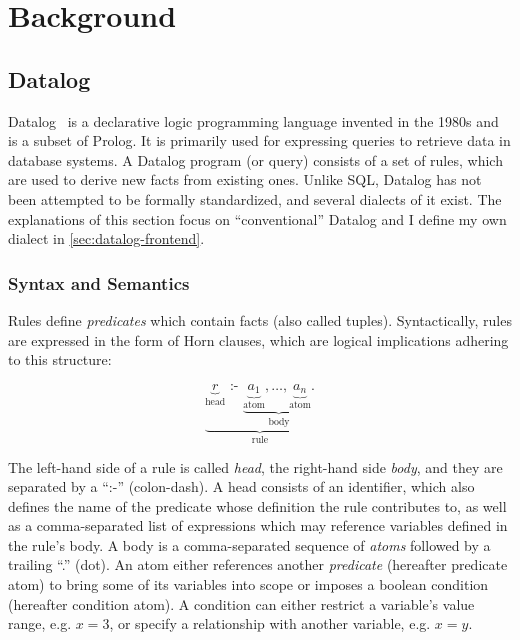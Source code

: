 
\chapter{Background}\label{ch:background}

\section{Datalog}\label{sec:datalog}

Datalog~\cite{green2013datalog} is a declarative logic programming language
invented in the 1980s and is a subset of Prolog.
It is primarily used for expressing queries to retrieve data in database systems.
A Datalog program (or query) consists of a set of rules,
which are used to derive new facts from existing ones.
Unlike SQL, Datalog has not been attempted to be formally standardized,
and several dialects of it exist.
The explanations of this section focus on ``conventional'' Datalog
and I define my own dialect in \ref{sec:datalog-frontend}.

\subsection{Syntax and Semantics}\label{sec:datalog-syntax-semantics}

Rules define \emph{predicates} which contain facts (also called tuples).
Syntactically, rules are expressed in the form of Horn clauses,
which are logical implications adhering to this structure:

\begin{equation}
    \underbrace{
    \underbrace{r}_{\text{head}}
    \text{ :- }
    \underbrace{
    \underbrace{a_1}_{\text{atom}},
    \ldots,
    \underbrace{a_n}_{\text{atom}}.
    }_{\text{body}}
    }_{\text{rule}}
\end{equation}

The left-hand side of a rule is called \emph{head}, the right-hand side \emph{body},
and they are separated by a ``:-'' (colon-dash).
A head consists of an identifier, which also defines the name of the predicate
whose definition the rule contributes to, as well as a comma-separated list of expressions
which may reference variables defined in the rule's body.
A body is a comma-separated sequence of \emph{atoms} followed by a trailing ``.'' (dot).
An atom either references another \emph{predicate} (hereafter predicate atom)
to bring some of its variables into scope or imposes a boolean condition
(hereafter condition atom).
A condition can either restrict a variable's value range, e.g. \(x = 3\),
or specify a relationship with another variable, e.g. \(x = y\).

